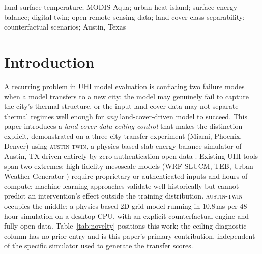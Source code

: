 \documentclass[conference]{IEEEtran}
\begin{document}
\begin{IEEEkeywords}
land surface temperature; MODIS Aqua; urban heat island; surface energy
balance; digital twin; open remote-sensing data; land-cover class
separability; counterfactual scenarios; Austin, Texas
\end{IEEEkeywords}

\section{Introduction}

A recurring problem in UHI model evaluation is conflating two failure
modes when a model transfers to a new city: the model may genuinely fail
to capture the city's thermal structure, or the input land-cover data may
not separate thermal regimes well enough for \emph{any} land-cover-driven
model to succeed. This paper introduces a \emph{land-cover data-ceiling
control} that makes the distinction explicit, demonstrated on a
three-city transfer experiment (Miami, Phoenix, Denver) using
\textsc{austin-twin}, a physics-based slab energy-balance simulator of
Austin, TX driven entirely by zero-authentication open data
\cite{oke1982energetic, voogt2003thermal, masson2000physically}. Existing
UHI tools span two extremes: high-fidelity mesoscale models (WRF-SLUCM,
TEB, Urban Weather Generator \cite{bueno2013urban, kusaka2001simple})
require proprietary or authenticated inputs and hours of compute;
machine-learning approaches \cite{lyu2022integrated, hoang2025geospatial,
bhamjee2024detection} validate well historically but cannot predict an
intervention's effect outside the training distribution.
\textsc{austin-twin} occupies the middle: a physics-based 2D grid model
running in $10.8$\,ms per 48-hour simulation on a desktop CPU, with an
explicit counterfactual engine and fully open data. Table~\ref{tab:novelty}
positions this work; the ceiling-diagnostic column has no prior entry and
is this paper's primary contribution, independent of the specific
simulator used to generate the transfer scores.
\end{document}
